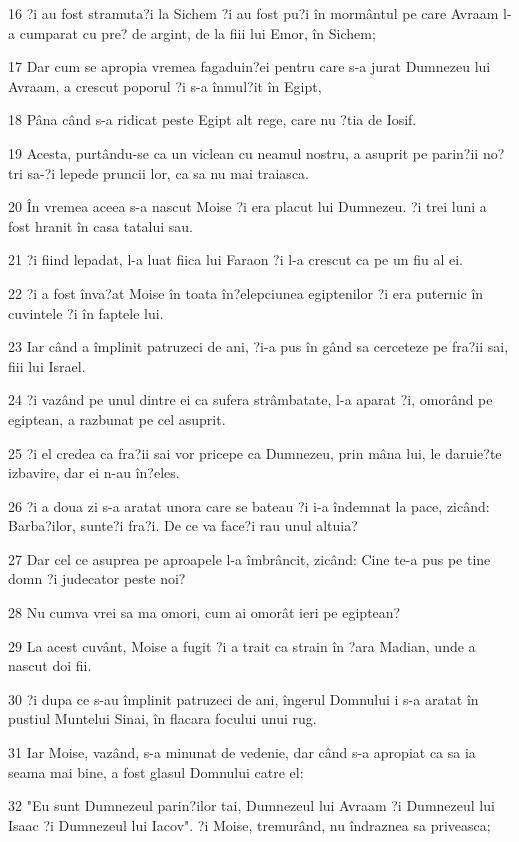 \par 16 ?i au fost stramuta?i la Sichem ?i au fost pu?i în mormântul pe care Avraam l-a cumparat cu pre? de argint, de la fiii lui Emor, în Sichem;
\par 17 Dar cum se apropia vremea fagaduin?ei pentru care s-a jurat Dumnezeu lui Avraam, a crescut poporul ?i s-a înmul?it în Egipt,
\par 18 Pâna când s-a ridicat peste Egipt alt rege, care nu ?tia de Iosif.
\par 19 Acesta, purtându-se ca un viclean cu neamul nostru, a asuprit pe parin?ii no?tri sa-?i lepede pruncii lor, ca sa nu mai traiasca.
\par 20 În vremea aceea s-a nascut Moise ?i era placut lui Dumnezeu. ?i trei luni a fost hranit în casa tatalui sau.
\par 21 ?i fiind lepadat, l-a luat fiica lui Faraon ?i l-a crescut ca pe un fiu al ei.
\par 22 ?i a fost înva?at Moise în toata în?elepciunea egiptenilor ?i era puternic în cuvintele ?i în faptele lui.
\par 23 Iar când a împlinit patruzeci de ani, ?i-a pus în gând sa cerceteze pe fra?ii sai, fiii lui Israel.
\par 24 ?i vazând pe unul dintre ei ca sufera strâmbatate, l-a aparat ?i, omorând pe egiptean, a razbunat pe cel asuprit.
\par 25 ?i el credea ca fra?ii sai vor pricepe ca Dumnezeu, prin mâna lui, le daruie?te izbavire, dar ei n-au în?eles.
\par 26 ?i a doua zi s-a aratat unora care se bateau ?i i-a îndemnat la pace, zicând: Barba?ilor, sunte?i fra?i. De ce va face?i rau unul altuia?
\par 27 Dar cel ce asuprea pe aproapele l-a îmbrâncit, zicând: Cine te-a pus pe tine domn ?i judecator peste noi?
\par 28 Nu cumva vrei sa ma omori, cum ai omorât ieri pe egiptean?
\par 29 La acest cuvânt, Moise a fugit ?i a trait ca strain în ?ara Madian, unde a nascut doi fii.
\par 30 ?i dupa ce s-au împlinit patruzeci de ani, îngerul Domnului i s-a aratat în pustiul Muntelui Sinai, în flacara focului unui rug.
\par 31 Iar Moise, vazând, s-a minunat de vedenie, dar când s-a apropiat ca sa ia seama mai bine, a fost glasul Domnului catre el:
\par 32 "Eu sunt Dumnezeul parin?ilor tai, Dumnezeul lui Avraam ?i Dumnezeul lui Isaac ?i Dumnezeul lui Iacov". ?i Moise, tremurând, nu îndraznea sa priveasca;
